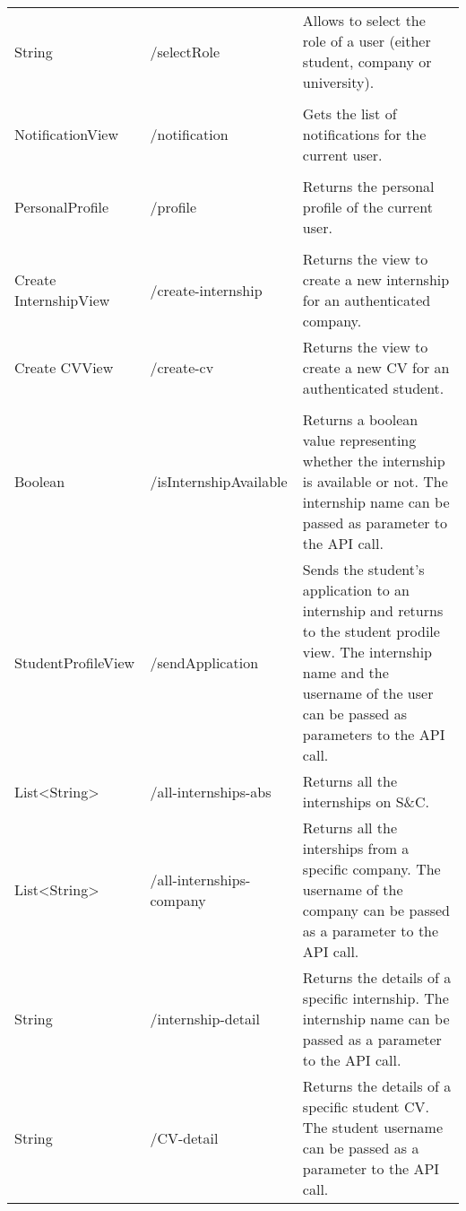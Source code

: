 \begin{longtable}{p{}p{}p{}}
    String &
    /selectRole &
    Allows to select the role of a user (either student, company or university). \\
    \vspace{0.5em}\\
    NotificationView &
    /notification &
    Gets the list of notifications for the current user. \\
    \vspace{0.5em}\\
    PersonalProfile &
    /profile &
    Returns the personal profile of the current user. \\
    \vspace{0.5em}\\
    Create InternshipView &
    /create-internship &
    Returns the view to create
    a new internship for an
    authenticated company.
    \vspace{0.5em}\\
    Create CVView &
    /create-cv &
    Returns the view to create a new CV
    for an authenticated student. \\
    \vspace{0.5em}\\
    Boolean &
    /isInternshipAvailable &
    Returns a boolean value representing whether the internship is available or not. The internship name can be passed as parameter to the API call.
    \vspace{0.5em}\\
    StudentProfileView &
    /sendApplication &
    Sends the student's application to an internship and returns to the student prodile view. The internship name and the username of the user can be passed as parameters to the API call.
    \vspace{0.5em}\\
    List<String> &
    /all-internships-abs &
    Returns all the internships on S\&C.
    \vspace{0.5em}\\
    List<String> &
    /all-internships-company &
    Returns all the interships from a specific company. The username of the company can be passed as a parameter to the API call.
    \vspace{0.5em}\\
    String &
    /internship-detail &
    Returns the details of a specific internship. The internship name can be passed as a parameter to the API call.
    \vspace{0.5em}\\
    String &
    /CV-detail &
    Returns the details of a specific student CV. The student username can be passed as a parameter to the API call.

\end{longtable}


